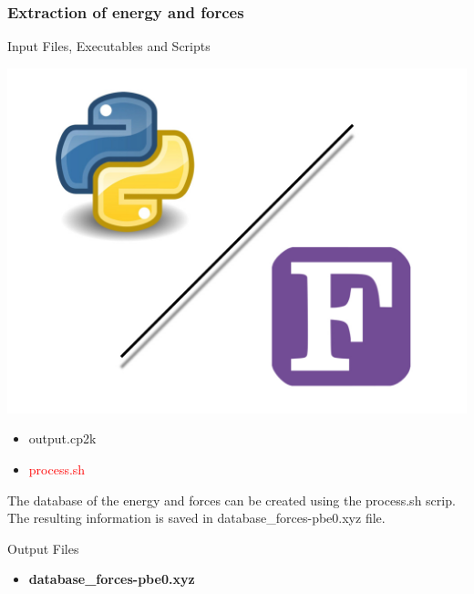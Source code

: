 \documentclass[12pt]{article}
\begin{document}
\subsubsection{Extraction of energy and forces}
\begin{mybox2}{{Input Files, Executables and Scripts}}
\begin{minipage}[c]{0.5\linewidth}
\includegraphics[scale=0.1]{Python-fortran.jpeg}
\end{minipage}
\begin{minipage}[c]{0.5\linewidth}
\begin{itemize}
    \item output.cp2k
  \item \textcolor{red}{process.sh}
\end{itemize}
\end{minipage}
\end{mybox2}
The database of the energy and forces can be created using the process.sh scrip. The resulting information is saved in database\_forces-pbe0.xyz file.
\\
\begin{mybox3}{Output Files}
\begin{itemize}
    \item \textbf{database\_forces-pbe0.xyz}
\end{itemize}
\end{mybox3}
%
\end{document}
